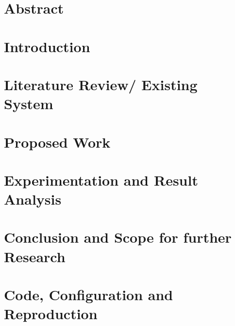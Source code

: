 \documentclass[a4paper, 12pt]{report}
\theoremstyle{definition}
\begin{document}
\chapter*{Abstract}


\clearpage
{}
\setcounter{page}{1}
\chapter{Introduction}

\chapter{Literature Review/ Existing System}

\chapter{Proposed Work}

\chapter{Experimentation and Result Analysis}

\chapter{Conclusion and Scope for further Research}

\appendix
\chapter{Code, Configuration and Reproduction}


\newpage
\renewcommand{\bibname}{References}


\end{document}
